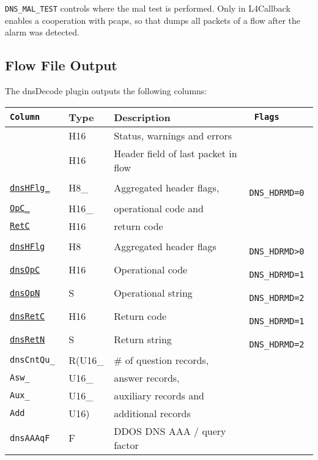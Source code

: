 \documentclass[documentation]{subfiles}
\begin{document}
{\tt DNS\_MAL\_TEST} controls where the mal test is performed. Only in L4Callback enables a cooperation
with pcaps, so that  dumps all packets of a flow after the alarm was detected.

\clearpage

\subsection{Flow File Output}
The dnsDecode plugin outputs the following columns:
\begin{longtable}{>{\tt}lll>{\tt\small}l}
    \toprule
    {\bf Column}                          & {\bf Type}  & {\bf Description}                   & {\bf Flags}\\
    \midrule\endhead%

    \nameref{dnsStat}                     & H16         & Status, warnings and errors         & \\
    \nameref{dnsHdrOPField}               & H16         & Header field of last packet in flow & \\
    \hyperref[dnsHFlgOpCRetC]{dnsHFlg\_}  & H8\_        & Aggregated header flags,            & DNS\_HDRMD=0\\
    \quad\hyperref[dnsHFlgOpCRetC]{OpC\_} & \quad H16\_ & \quad operational code and          & \\
    \quad\hyperref[dnsHFlgOpCRetC]{RetC}  & \quad H16   & \quad return code                   & \\
    \hyperref[dnsHFlgOpCRetC]{dnsHFlg}    & H8          & Aggregated header flags             & DNS\_HDRMD>0\\
    \hyperref[dnsHFlgOpCRetC]{dnsOpC}     & H16         & Operational code                    & DNS\_HDRMD=1\\
    \hyperref[dnsHFlgOpCRetC]{dnsOpN}     & S           & Operational string                  & DNS\_HDRMD=2\\
    \hyperref[dnsHFlgOpCRetC]{dnsRetC}    & H16         & Return code                         & DNS\_HDRMD=1\\
    \hyperref[dnsHFlgOpCRetC]{dnsRetN}    & S           & Return string                       & DNS\_HDRMD=2\\
    dnsCntQu\_                            & R(U16\_     & \# of question records,             & \\
    \quad Asw\_                           & \quad U16\_ & \quad answer records,               & \\
    \quad Aux\_                           & \quad U16\_ & \quad auxiliary records and         & \\
    \quad Add                             & \quad U16)  & \quad additional records            & \\
    dnsAAAqF                              & F           & DDOS DNS AAA / query factor         & \\


\end{longtable}
\end{document}
